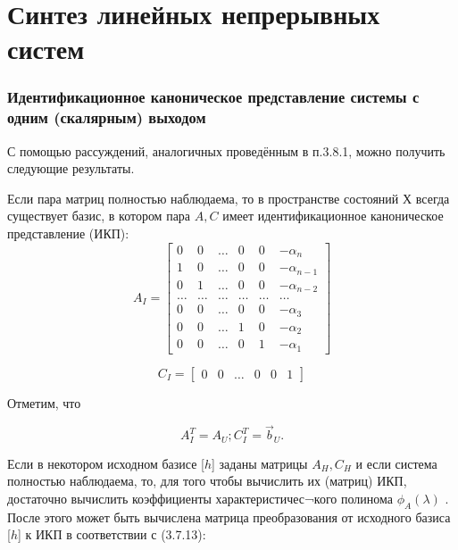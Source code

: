 \chapter{Синтез линейных непрерывных систем}
\setcounter{section}{8} %
\setcounter{subsection}{2} %
\setcounter{equation}{23} %
\setcounter{figure}{7}%

\subsection{Идентификационное каноническое представление системы с одним (скалярным) выходом}
С помощью рассуждений, аналогичных проведённым в п.3.8.1, можно получить следующие результаты.

Если пара матриц    полностью наблюдаема,  то  в   пространстве состояний  Х  всегда существует базис, в котором пара ${A,C}$  имеет идентификационное каноническое представление (ИКП):
\begin{equation}
	A_I = 
	\begin{bmatrix}
	    0 & 0 & \dots & 0 & 0 & -\alpha_n \\
	    1 & 0 & \dots & 0 & 0 & -\alpha_{n-1} \\
	    0 & 1 & \dots & 0 & 0 & -\alpha_{n-2} \\
	    \dots & \dots & \dots & \dots & \dots & \dots \\
	    0 & 0 & \dots & 0 & 0 & -\alpha_3 \\
	    0 & 0 & \dots & 1 & 0 & -\alpha_2 \\
	    0 & 0 & \dots & 0 & 1 & -\alpha_1
	\end{bmatrix}
\end{equation}

\begin{equation}
	C_I = 
	\begin{bmatrix}
	    0 & 0 & \dots & 0 & 0 & 1
	\end{bmatrix}
\end{equation}

Отметим, что

\begin{equation}
	A_I^T = A_U; C_I^T=\vec{b}_U.
\end{equation}

Если   в  некотором  исходном  базисе [$h$] заданы матрицы $A_H, C_H$ и если система полностью наблюдаема, то, для того чтобы вычислить их (матриц) ИКП, достаточно вычислить коэффициенты характеристичес¬кого полинома $\phi_A(\lambda)$ . После этого может быть вычислена матрица преобразования от исходного базиса [$h$] к ИКП в соответствии с (3.7.13):

